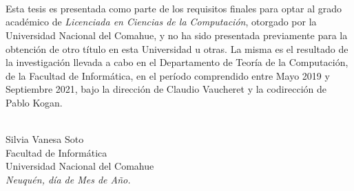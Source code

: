 \ \\
\ \\
\label{pagpref}
\\
\ \\
\ \\

\ \\

\ \\
\ \\


Esta tesis es presentada como parte de los requisitos finales para optar al grado acad\'emico de {\em Licenciada en Ciencias de la Computación}, otorgado por la Universidad Nacional del Comahue, y no ha sido presentada previamente para la obtención de otro título en esta Universidad u otras. La misma es el resultado de la investigación llevada a cabo en el Departamento de Teoría de la Computación, de la Facultad de Informática, en el período comprendido entre Mayo 2019 y Septiembre 2021, bajo la dirección de Claudio Vaucheret y la codirección de Pablo Kogan.
\vspace{3cm}


\ \\
{\flushright Silvia Vanesa Soto\\
{\sc Facultad de Informática \\
Universidad Nacional del Comahue}\\
{\em Neuqu\'en, d\'ia de Mes de A\~no.}\\}

\vfill

